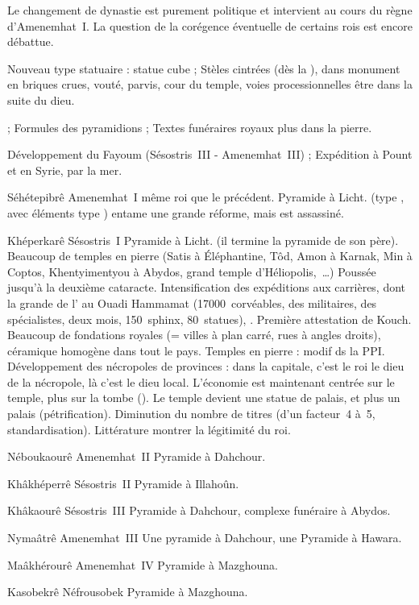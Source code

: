 
Le changement de dynastie est purement politique et intervient 
au cours du règne d'Amenemhat~I\ier. La question de la corégence 
éventuelle de certains rois est encore débattue.

Nouveau type statuaire : statue cube ;
Stèles cintrées (dès la \PPI), dans monument en briques crues, vouté, 
parvis, cour du temple, voies processionnelles \donc{} être dans la 
suite du dieu.

\TS ;
Formules des pyramidions ;
Textes funéraires royaux plus dans la pierre.

Développement du Fayoum (Sésostris~III - Amenemhat~III) ; 
Expédition à Pount et en Syrie, par la mer.

\noindent{} 

\begin{listerois}
  \item [Séhétepibrê Amenemhat~I] même roi que le précédent. 
        Pyramide à Licht. (type , avec éléments type )
        entame une grande réforme, mais est assassiné.
  \item [Khéperkarê Sésostris~I] Pyramide à Licht. (il termine la 
        pyramide de son père). Beaucoup de temples en pierre (Satis à 
        Éléphantine, Tôd, Amon à Karnak, Min à Coptos, Khentyimentyou 
        à Abydos, grand temple d'Héliopolis,~\dots) Poussée jusqu'à la 
        deuxième cataracte.
        Intensification des expéditions aux carrières, dont la grande 
        de l' au Ouadi Hammamat (\num{17000}~corvéables, des 
        militaires, des spécialistes, deux mois, \num{150}~sphinx, 
        \num{80}~statues), \SeK.
        Première attestation de Kouch.
        Beaucoup de fondations royales (= villes à plan carré, rues à 
        angles droits), céramique homogène dans tout le pays. Temples 
        en pierre : modif ds la PPI. Développement des nécropoles de 
        provinces : dans la capitale, c'est le roi le dieu de la 
        nécropole, là c'est le dieu local. L'économie est maintenant 
        centrée sur le temple, plus sur la tombe ().
        Le temple devient une statue de palais, et plus un palais 
        (pétrification).
        Diminution du nombre de titres (d'un facteur~\num{4} 
        à~\num{5}, standardisation).
        Littérature \donc{} montrer la légitimité du roi.
  \item [Néboukaourê Amenemhat~II] Pyramide à Dahchour.
  \item [Khâkhéperrê Sésostris~II] Pyramide à Illahoûn.
  \item [Khâkaourê Sésostris~III] Pyramide à Dahchour, complexe 
        funéraire à Abydos.
  \item [Nymaâtrê Amenemhat~III] Une pyramide à Dahchour, une 
        Pyramide à Hawara.
  \item [Maâkhérourê Amenemhat~IV] Pyramide à Mazghouna.
  \item [Kasobekrê Néfrousobek] Pyramide à Mazghouna.
\end{listerois}

